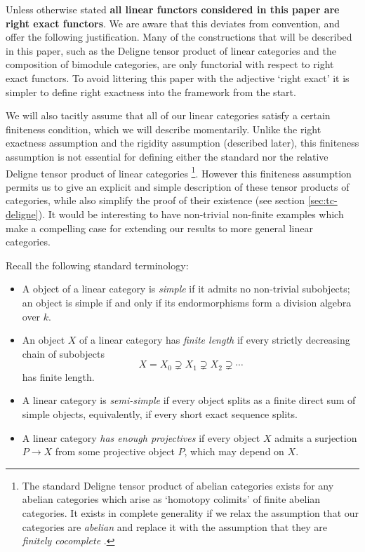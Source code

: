 \documentclass{amsart}
\begin{document}
\begin{warning}
	Unless otherwise stated {\bfseries all linear functors considered in this paper are  right exact functors}.  We are aware that this deviates from convention, and offer the following justification. Many of the constructions that will be described in this paper, such as the Deligne tensor product of linear categories and the composition of bimodule categories, are only functorial with respect to right exact functors. To avoid littering this paper with the adjective `right exact' it is simpler to define right exactness into the framework from the start.  
\end{warning}

We will also tacitly assume that all of our linear categories satisfy a certain finiteness condition, which we will describe momentarily. Unlike the right exactness assumption and the rigidity assumption (described later), this finiteness assumption is not essential for defining either the standard nor the relative Deligne tensor product of linear categories   \footnote{The standard Deligne tensor product of abelian categories exists for any abelian categories which arise as `homotopy colimits' of finite abelian categories. It exists in complete generality if we relax the assumption that our categories are {\em abelian} and replace it with the assumption that they are {\em finitely cocomplete} \cite{1212.1545}.}. However this finiteness assumption permits us to give an explicit and simple 
description of these tensor products of categories, while also simplify the proof of their existence (see section \ref{sec:tc-deligne}). It would be interesting to have non-trivial non-finite examples which make a compelling case for extending our results to more general linear categories.  

Recall the following standard terminology:
\begin{itemize}
	\item A object of a linear category is {\em simple} if it admits no non-trivial subobjects; an object is simple if and only if its endormorphisms form a division algebra over $k$. 
	\item An object $X$ of a linear category has {\em finite length} if every strictly decreasing chain of subobjects
	\begin{equation*}
		X = X_0 \supsetneq X_1 \supsetneq X_2 \supsetneq  \cdots 
	\end{equation*}
	has finite length. 
	\item A linear category is {\em semi-simple} if every object splits as a finite direct sum of simple objects, equivalently, if every short exact sequence splits. 
	\item A linear category {\em has enough projectives} if every object $X$ admits a surjection $P \to X$ from some projective object $P$, which may depend on $X$. 
\end{itemize}
\end{document}
